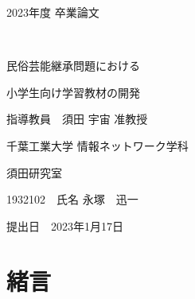 \documentclass[12pt]{ltjsarticle}
\begin{document}
\begin{titlepage}
  \begin{center}
  
    \vspace*{20truept}
    
    {\LARGE 2023年度 卒業論文} 
    
    \vspace*{75truept}
    
    {\Huge }　%

    \vspace{10truept}

    {\Huge 民俗芸能継承問題における}　%

    \vspace{10truept}

    {\Huge 小学生向け学習教材の開発}　%

    \vspace{85truept}
    
    {\LARGE 指導教員　須田 宇宙 准教授}
    
    \vspace{60truept}
    
    {\LARGE 千葉工業大学 情報ネットワーク学科}
    
    \vspace{15truept}
    
    {\LARGE 須田研究室}
    
    \vspace{70truept}
    
    {\LARGE 1932102　氏名 永塚　迅一 }　%

    \vspace{70truept}
    
  \end{center}
  \begin{flushright}

    {\LARGE 提出日　2023年1月17日}
  
  \end{flushright}
\end{titlepage}

\newpage
\setcounter{tocdepth}{3}
\pagestyle{plain}



\tableofcontents
\listoftables
\listoffigures
\newpage
{}
\section{緒言}
\end{document}
